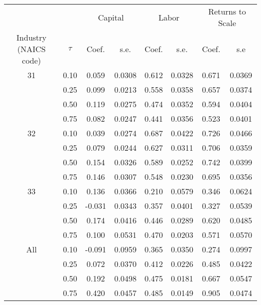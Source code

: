 \begin{table}[ht]
\centering
\begin{tabular}{cccccccc}
  \hline\hline & & \multicolumn{2}{c}{Capital}  & \multicolumn{2}{c}{Labor} & \multicolumn{2}{c}{Returns to Scale} \\ \cmidrule(lr){3-4} \cmidrule(lr){5-6} \cmidrule(lr){7-8}Industry (NAICS code) & $\tau$ & Coef. & s.e. & Coef. & s.e. & Coef. & s.e \\ 
  \hline
31 & 0.10 & 0.059 & 0.0308 & 0.612 & 0.0328 & 0.671 & 0.0369 \\ 
   & 0.25 & 0.099 & 0.0213 & 0.558 & 0.0358 & 0.657 & 0.0374 \\ 
   & 0.50 & 0.119 & 0.0275 & 0.474 & 0.0352 & 0.594 & 0.0404 \\ 
   & 0.75 & 0.082 & 0.0247 & 0.441 & 0.0356 & 0.523 & 0.0401 \\ 
  32 & 0.10 & 0.039 & 0.0274 & 0.687 & 0.0422 & 0.726 & 0.0466 \\ 
   & 0.25 & 0.079 & 0.0244 & 0.627 & 0.0311 & 0.706 & 0.0359 \\ 
   & 0.50 & 0.154 & 0.0326 & 0.589 & 0.0252 & 0.742 & 0.0399 \\ 
   & 0.75 & 0.146 & 0.0307 & 0.548 & 0.0230 & 0.695 & 0.0356 \\ 
  33 & 0.10 & 0.136 & 0.0366 & 0.210 & 0.0579 & 0.346 & 0.0624 \\ 
   & 0.25 & -0.031 & 0.0343 & 0.357 & 0.0401 & 0.327 & 0.0539 \\ 
   & 0.50 & 0.174 & 0.0416 & 0.446 & 0.0289 & 0.620 & 0.0485 \\ 
   & 0.75 & 0.100 & 0.0531 & 0.470 & 0.0203 & 0.571 & 0.0570 \\ 
  All & 0.10 & -0.091 & 0.0959 & 0.365 & 0.0350 & 0.274 & 0.0997 \\ 
   & 0.25 & 0.072 & 0.0370 & 0.412 & 0.0226 & 0.485 & 0.0422 \\ 
   & 0.50 & 0.192 & 0.0498 & 0.475 & 0.0181 & 0.667 & 0.0547 \\ 
   & 0.75 & 0.420 & 0.0457 & 0.485 & 0.0149 & 0.905 & 0.0474 \\ 
   \hline
\end{tabular}
\end{table}
